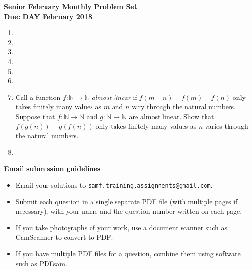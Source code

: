 \documentclass{article}
\begin{document}
\begin{center}
\textbf{\Large Senior February Monthly Problem Set}
\\ \vspace{1em}
\textbf{\large Due: DAY February 2018}
\end{center}

\begin{enumerate}[1.]

\item


\vspace{6pt}
\item


\vspace{6pt}
\item


\vspace{6pt}
\item


\vspace{6pt}
\item


\vspace{6pt}
\item


\vspace{6pt}
\item
Call a function $f : \mathbb{N} \to \mathbb{N}$ \emph{almost linear} if $f(m + n) - f(m) - f(n)$ only takes finitely many values as $m$ and $n$ vary through the natural numbers. Suppose that $f : \mathbb{N} \to \mathbb{N}$ and $g : \mathbb{N} \to \mathbb{N}$ are almost linear. Show that $f(g(n)) - g(f(n))$ only takes finitely many values as $n$ varies through the natural numbers.


\vspace{6pt}
\item


\end{enumerate}

\vfill
\textbf{\Large Email submission guidelines}
\begin{itemize}
	\item Email your solutions to \verb!samf.training.assignments@gmail.com!.
	\item Submit each question in a single separate PDF file (with multiple pages if necessary), with your name and the question number written on each page.
	\item If you take photographs of your work, use a document scanner such as CamScanner to convert to PDF.
	\item If you have multiple PDF files for a question, combine them using software such as PDFsam.
\end{itemize}
\end{document}
